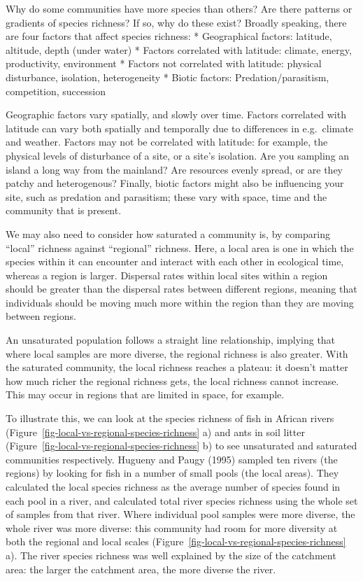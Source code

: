 \documentclass[
  letterpaper,
  DIV=11,
  numbers=noendperiod]{scrreprt}
\begin{document}
Why do some communities have more species than others? Are there
patterns or gradients of species richness? If so, why do these exist?
Broadly speaking, there are four factors that affect species richness: *
Geographical factors: latitude, altitude, depth (under water) * Factors
correlated with latitude: climate, energy, productivity, environment *
Factors not correlated with latitude: physical disturbance, isolation,
heterogeneity * Biotic factors: Predation/parasitism, competition,
succession

Geographic factors vary spatially, and slowly over time. Factors
correlated with latitude can vary both spatially and temporally due to
differences in e.g.~climate and weather. Factors may not be correlated
with latitude: for example, the physical levels of disturbance of a
site, or a site's isolation. Are you sampling an island a long way from
the mainland? Are resources evenly spread, or are they patchy and
heterogenous? Finally, biotic factors might also be influencing your
site, such as predation and parasitism; these vary with space, time and
the community that is present.

We may also need to consider how saturated a community is, by comparing
``local'' richness against ``regional'' richness. Here, a local area is
one in which the species within it can encounter and interact with each
other in ecological time, whereas a region is larger. Dispersal rates
within local sites within a region should be greater than the dispersal
rates between different regions, meaning that individuals should be
moving much more within the region than they are moving between regions.

An unsaturated population follows a straight line relationship, implying
that where local samples are more diverse, the regional richness is also
greater. With the saturated community, the local richness reaches a
plateau: it doesn't matter how much richer the regional richness gets,
the local richness cannot increase. This may occur in regions that are
limited in space, for example.

To illustrate this, we can look at the species richness of fish in
African rivers (Figure~\ref{fig-local-vs-regional-species-richness} a)
and ants in soil litter
(Figure~\ref{fig-local-vs-regional-species-richness} b) to see
unsaturated and saturated communities respectively. Hugueny and Paugy
(1995) sampled ten rivers (the regions) by looking for fish in a number
of small pools (the local areas). They calculated the local species
richness as the average number of species found in each pool in a river,
and calculated total river species richness using the whole set of
samples from that river. Where individual pool samples were more
diverse, the whole river was more diverse: this community had room for
more diversity at both the regional and local scales
(Figure~\ref{fig-local-vs-regional-species-richness} a). The river
species richness was well explained by the size of the catchment area:
the larger the catchment area, the more diverse the river.
\end{document}
